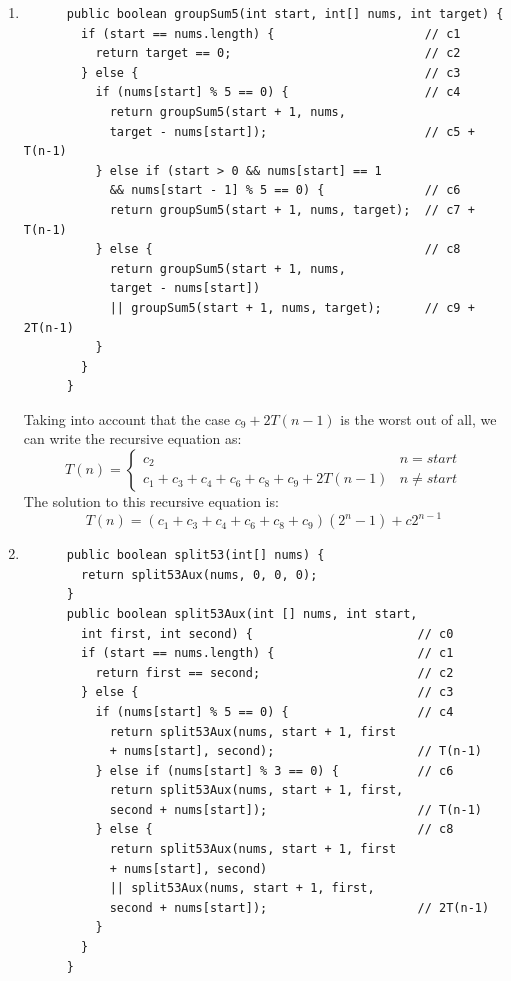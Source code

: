\documentclass[a4paper,12pt]{article}
\begin{document}
\begin{enumerate}
      \item \begin{Verbatim}
      public boolean groupSum5(int start, int[] nums, int target) {
        if (start == nums.length) {                     // c1
          return target == 0;                           // c2
        } else {                                        // c3
          if (nums[start] % 5 == 0) {                   // c4
            return groupSum5(start + 1, nums,
            target - nums[start]);                      // c5 + T(n-1)
          } else if (start > 0 && nums[start] == 1
            && nums[start - 1] % 5 == 0) {              // c6
            return groupSum5(start + 1, nums, target);  // c7 + T(n-1)
          } else {                                      // c8
            return groupSum5(start + 1, nums,
            target - nums[start])
            || groupSum5(start + 1, nums, target);      // c9 + 2T(n-1)
          }
        }
      }
      \end{Verbatim}
      Taking into account that the case $c_9+2T(n-1)$ is the worst out of all, we can write the recursive equation as:
      \begin{equation*}
        T\left( n \right)=\left\{\begin{array}{cc} c_{2} & n=start \\ c_{1}+c_{3}+c_{4}+c_{6}+c_{8}+c_{9}+2T\left( n-1 \right) & n\neq start\end{array}\right.
      \end{equation*}
      The solution to this recursive equation is:
        \begin{equation*}
T\left( n \right)=\left( c_{1}+c_{3}+c_{4}+c_{6}+c_{8}+c_{9} \right)\left( 2^{n}-1 \right)+c2^{n-1}
        \end{equation*}
      \item \begin{Verbatim}
      public boolean split53(int[] nums) {
        return split53Aux(nums, 0, 0, 0);
      }
      public boolean split53Aux(int [] nums, int start,
        int first, int second) {                       // c0
        if (start == nums.length) {                    // c1
          return first == second;                      // c2
        } else {                                       // c3
          if (nums[start] % 5 == 0) {                  // c4
            return split53Aux(nums, start + 1, first
            + nums[start], second);                    // T(n-1)
          } else if (nums[start] % 3 == 0) {           // c6
            return split53Aux(nums, start + 1, first,
            second + nums[start]);                     // T(n-1)
          } else {                                     // c8
            return split53Aux(nums, start + 1, first
            + nums[start], second)
            || split53Aux(nums, start + 1, first,
            second + nums[start]);                     // 2T(n-1)
          }
        }
      }
      \end{Verbatim}

    \end{enumerate}\cite{Wolfram}
    
\end{document}
